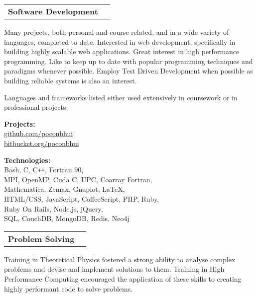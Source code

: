 \documentclass[11pt]{article}
\makeatletter
\newenvironment{resumeSubSectionHeader}{
    \par
    \begin{tabular*}{\textwidth}{l@{\extracolsep{\fill}}r}
    \par
} {
    \end{tabular*}
    \par
}
\newenvironment{resumeSubSectionBody}{
    \par
    \vspace{-0.8\parskip}
    \begin{small}
    \par
} {
    \par
    \end{small}
    \par
}
\makeatother
\begin{document}
%
%
\begin{resumeSubSectionHeader}

    \textbf{Software Development}

\end{resumeSubSectionHeader}
\begin{resumeSubSectionBody}

    Many projects, both personal and course related, and in a wide variety
    of languages, completed to date.
    Interested in web development, specifically in building highly
    scalable web applications.
    Great interest in high performance programming.
    Like to keep up to date with popular programming techniques and paradigms
    whenever possible.
    Employ Test Driven Development when possible as building reliable systems
    is also an interest.

    Languages and frameworks listed either used extensively in coursework
    or in professional projects.

    \begin{description}
        \item{\bf Projects:} \\
            \href{https://github.com/poconbhui}{github.com/poconbhui} \\
            \href{https://bitbucket.org/poconbhui}{bitbucket.org/poconbhui}

        \item{\bf Technologies:} \\
            Bash, C, C\verb!++!, Fortran 90, \\
            MPI, OpenMP, Cuda C, UPC, Coarray Fortran, \\
            Mathematica, Zemax, Gnuplot, LaTeX, \\
            HTML/CSS, JavaScript, CoffeeScript, PHP, Ruby, \\
            Ruby On Rails, Node.js, jQuery, \\
            SQL, CouchDB, MongoDB, Redis, Neo4j
    \end{description}

\end{resumeSubSectionBody}


%
%
\begin{resumeSubSectionHeader}

    \textbf{Problem Solving}

\end{resumeSubSectionHeader}
\begin{resumeSubSectionBody}

    Training in Theoretical Physics fostered a strong ability to
    analyse complex problems and devise and implement solutions to them.
    Training in High Performance Computing encouraged the application
    of these skills to creating highly performant code to solve
    problems.

\end{resumeSubSectionBody}
\end{document}
